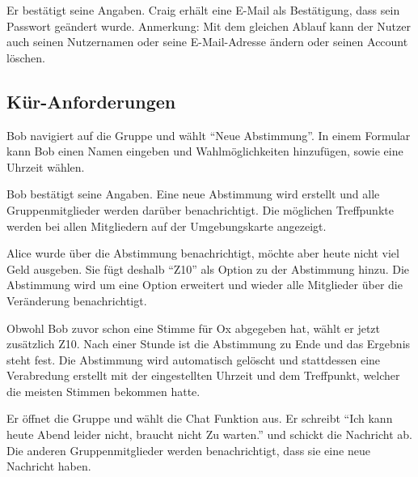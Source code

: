 \documentclass[parskip=full,11pt]{scrartcl}
\begin{document}
{Er bestätigt seine Angaben.}
{Craig erhält eine E-Mail als Bestätigung, dass sein Passwort geändert wurde.}
Anmerkung: Mit dem gleichen Ablauf kann der Nutzer auch seinen Nutzernamen oder seine
E-Mail-Adresse ändern oder seinen Account löschen.


\subsection{Kür-Anforderungen}
{Bob navigiert auf die Gruppe und wählt \enquote{Neue Abstimmung}.}
{In einem Formular kann Bob einen Namen eingeben und Wahlmöglichkeiten hinzufügen,
	sowie eine Uhrzeit wählen.}

{Bob bestätigt seine Angaben.}
{Eine neue Abstimmung wird erstellt und alle Gruppenmitglieder werden darüber benachrichtigt.
Die möglichen Treffpunkte werden bei allen Mitgliedern auf der Umgebungskarte angezeigt.}

{Alice wurde über die Abstimmung benachrichtigt, möchte aber heute nicht viel Geld ausgeben.
Sie fügt deshalb \enquote{Z10} als Option zu der Abstimmung hinzu.}
{Die Abstimmung wird um eine Option erweitert und 
wieder alle Mitglieder über die Veränderung benachrichtigt.}

{Obwohl Bob zuvor schon eine Stimme für Ox abgegeben hat, wählt er jetzt zusätzlich Z10.}
{Nach einer Stunde ist die Abstimmung zu Ende und das Ergebnis steht fest.
Die Abstimmung wird automatisch gelöscht und stattdessen eine Verabredung erstellt mit der 
eingestellten Uhrzeit und dem Treffpunkt, welcher die meisten Stimmen bekommen hatte.}


{Er öffnet die Gruppe und wählt die Chat Funktion aus. Er schreibt \enquote{Ich kann heute Abend leider nicht, braucht nicht Zu warten.} und schickt die Nachricht ab.}
{Die anderen Gruppenmitglieder werden benachrichtigt, dass sie eine neue Nachricht haben.}
\end{document}
